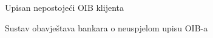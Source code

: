 \begin{packed_item}
\begin{packed_item}
                		\item[1.a] Upisan nepostojeći OIB klijenta
                		\item[] \begin{packed_enum}
                			
                			\item Sustav obavještava bankara o neuspjelom upisu OIB-a
                			
                		\end{packed_enum}
                		
                	\end{packed_item}
                \end{packed_item}
            
            	\noindent {}
